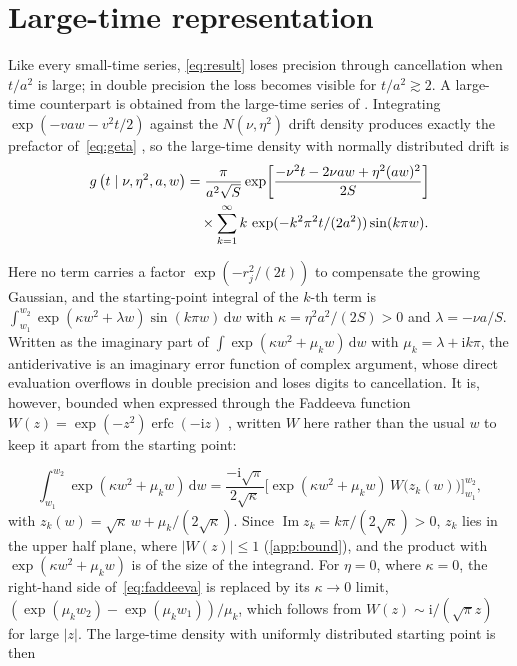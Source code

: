 \documentclass[final,5p,times,twocolumn,authoryear]{elsarticle}
\newcommand{\dd}{\,\mathrm{d}}
\newcommand{\I}{\mathrm{i}}
\begin{document}
\section{Large-time representation}
\label{sec:large}

Like every small-time series, \eqref{eq:result} loses precision through cancellation when $t/a^2$ is large; in double precision the loss becomes visible for $t/a^2 \gtrsim 2$. A large-time counterpart is obtained from the large-time series of \citet{Ratcliff1978}. Integrating $\exp(-vaw - v^2 t/2)$ against the $N(\nu, \eta^2)$ drift density produces exactly the prefactor of~\eqref{eq:geta} \citep[Eqs.~4.54--4.58]{SmithRatcliff2025}, so the large-time density with normally distributed drift is \citep[see also][Eq.~7]{FosterSingmann2021}
\begin{align}
g\left(t \mid \nu, \eta^2, a, w\right)
 &= \frac{\pi}{a^2\sqrt{S}}\exp\!\left[\frac{-\nu^2 t - 2\nu a w + \eta^2 (a w)^2}{2S}\right] \notag\\
 &\quad\times \sum_{k=1}^{\infty} k\, \exp(-k^2\pi^2 t/(2a^2))\sin(k\pi w) .
\label{eq:large}
\end{align}
\begin{sloppypar}
Here no term carries a factor $\exp(-r_j^2/(2t))$ to compensate the growing Gaussian, and the starting-point integral of the $k$-th term is $\int_{w_1}^{w_2} \exp(\kappa w^2 + \lambda w)\sin(k\pi w)\dd w$ with $\kappa = \eta^2 a^2/(2S) > 0$ and $\lambda = -\nu a/S$. Written as the imaginary part of $\int \exp(\kappa w^2 + \mu_k w)\dd w$ with $\mu_k = \lambda + \I k\pi$, the antiderivative is an imaginary error function of complex argument, whose direct evaluation overflows in double precision and loses digits to cancellation. It is, however, bounded when expressed through the Faddeeva function $W(z) = \exp(-z^2)\operatorname{erfc}(-\I z)$ \citep[Eq.~7.1.3]{AbramowitzStegun1964}, written $W$ here rather than the usual $w$ to keep it apart from the starting point:
\end{sloppypar}
{\small
\begin{equation}
\int_{w_1}^{w_2} \exp(\kappa w^2 + \mu_k w)\dd w
 = \frac{-\I\sqrt{\pi}}{2\sqrt{\kappa}}
   \Big[\exp(\kappa w^2 + \mu_k w)\, W\!\big(z_k(w)\big)\Big]_{w_1}^{w_2},
\label{eq:faddeeva}
\end{equation}}%
with $z_k(w) = \sqrt{\kappa}\, w + \mu_k/(2\sqrt{\kappa})$.
Since $\operatorname{Im} z_k = k\pi/(2\sqrt{\kappa}) > 0$, $z_k$ lies in the upper half plane, where $|W(z)| \le 1$ (\ref{app:bound}), and the product with $\exp(\kappa w^2 + \mu_k w)$ is of the size of the integrand. For $\eta = 0$, where $\kappa = 0$, the right-hand side of~\eqref{eq:faddeeva} is replaced by its $\kappa \to 0$ limit, $(\exp(\mu_k w_2) - \exp(\mu_k w_1))/\mu_k$, which follows from $W(z) \sim \I/(\sqrt\pi z)$ for large $|z|$. The large-time density with uniformly distributed starting point is then
\end{document}
